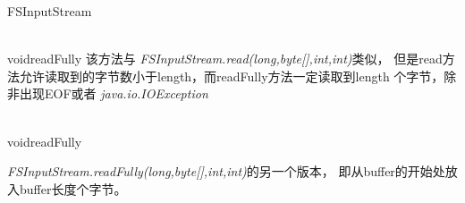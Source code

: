 \begin{XeClass}{FSInputStream}
\begin{XeMethod}{\XePublic\\ }{void}{readFully}
 该方法与 \emph{FSInputStream.read(long,byte[],int,int)}类似，
 但是read方法允许读取到的字节数小于length，而readFully方法一定读取到length
 个字节，除非出现EOF或者 \emph{java.io.IOException}

  \end{XeMethod}

  \begin{XeMethod}{\XePublic\\ }{void}{readFully}
       
 \emph{FSInputStream.readFully(long,byte[],int,int)}的另一个版本，
 即从buffer的开始处放入buffer长度个字节。

  \end{XeMethod}

\end{XeClass}
